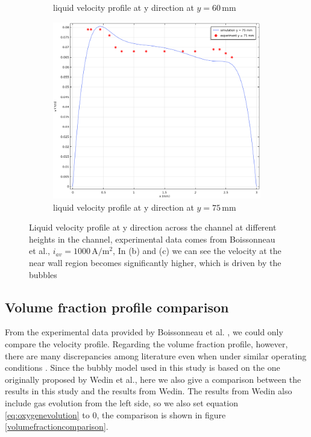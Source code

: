 \begin{figure}[H]
\begin{subfigure}{0.5\textwidth}
  \caption{liquid velocity profile at y direction at $ y = 60 \, \mathrm{mm} $}
  \label{rectangular}
\end{subfigure}
\begin{subfigure}{0.5\textwidth}
  \centering
  \includegraphics[width=1\linewidth]{squarechannelvalidation2.png}
  \caption{liquid velocity profile at y direction at $ y = 75 \, \mathrm{mm} $}
  \label{rectangular}
\end{subfigure}
\caption{Liquid velocity profile at y direction across the channel at different heights in the channel, experimental data comes from Boissonneau et al.\cite{Boissonneau2000}, $i_{av} = 1000 \, \mathrm{A/m^2}$, In (b) and (c) we can see the velocity at the near wall region becomes significantly higher, which is driven by the bubbles}
\label{squarechannelresult}
\end{figure}


\subsection{Volume fraction profile comparison}

From the experimental data provided by Boissonneau et al. \cite{Boissonneau2000}, we could only compare the velocity profile. Regarding the volume fraction profile, however, there are many discrepancies among literature even when under similar operating conditions \cite{abdelouahed2014hydrodynamics, Mat2005, philippe2005modelling}. Since the bubbly model used in this study is based on the one originally proposed by Wedin et al.\cite{Wedin2001}, here we also give a comparison between the results in this study and the results from Wedin. The results from Wedin also include gas evolution from the left side, so we also set equation \ref{eq:oxygenevolution} to 0, the comparison is shown in figure \ref{volumefractioncomparison}.

